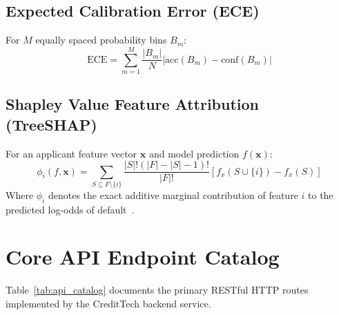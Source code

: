 \subsection{Expected Calibration Error (ECE)}
For $M$ equally spaced probability bins $B_m$:
$$\text{ECE} = \sum_{m=1}^{M} \frac{|B_m|}{N} \left| \text{acc}(B_m) - \text{conf}(B_m) \right|$$

\subsection{Shapley Value Feature Attribution (TreeSHAP)}
For an applicant feature vector $\mathbf{x}$ and model prediction $f(\mathbf{x})$:
$$\phi_i(f, \mathbf{x}) = \sum_{S \subseteq F \setminus \{i\}} \frac{|S|!(|F| - |S| - 1)!}{|F|!} \left[ f_x(S \cup \{i\}) - f_x(S) \right]$$
Where $\phi_i$ denotes the exact additive marginal contribution of feature $i$ to the predicted log-odds of default~\cite{lundberg_shap_2017}.

\section{Core API Endpoint Catalog}
Table~\ref{tab:api_catalog} documents the primary RESTful HTTP routes implemented by the CreditTech backend service.

